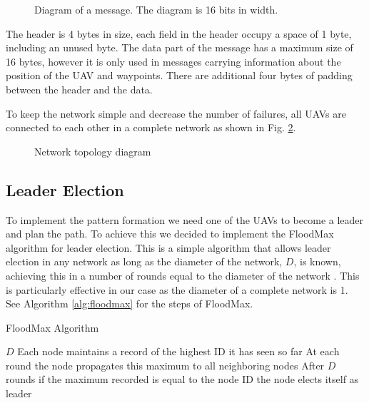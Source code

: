 \begin{figure}[h]
	\begin{center}
		
	\end{center}
	\caption{Diagram of a message. The diagram is 16 bits in width.}\label{fig:packet}
\end{figure}

The header is 4 bytes in size, each field in the header occupy a space of 1 byte, including an 
unused byte. The data part of the message has a maximum size of 16 bytes, however it is only 
used in messages carrying information about the position of the UAV and waypoints. There are 
additional four bytes of padding between the header and the data.

To keep the network simple and decrease the number of failures, all UAVs are connected to each 
other in a complete network as shown in Fig. \ref{fig:net}.

\begin{figure}
	\begin{center}
		
	\end{center}
	\caption{Network topology diagram}\label{fig:net}
\end{figure}

\subsection{Leader Election}

To implement the pattern formation we need one of the UAVs to become a leader and plan the path. 
To achieve this we decided to implement the FloodMax algorithm for leader election. This is a 
simple algorithm that allows leader election in any network as long as the diameter of the network, $D$,
is known, achieving this in a number of rounds equal to the diameter of the network \autocite{EK23}. 
This is particularly effective in our case as the diameter of a complete network is 1. See Algorithm
\ref{alg:floodmax} for the steps of FloodMax.

\begin{algorithm}
	\algrenewcommand{}
	\algrenewcommand{}
	\caption{FloodMax Algorithm}\label{alg:floodmax}
	\begin{algorithmic}[1]
		\Require $D$
		\State Each node maintains a record of the highest ID it has seen so far 
		\State At each round the node propagates this maximum to all neighboring nodes
		\State After $D$ rounds if the maximum recorded is equal to the node ID the node elects itself as leader
	\end{algorithmic}
\end{algorithm}


